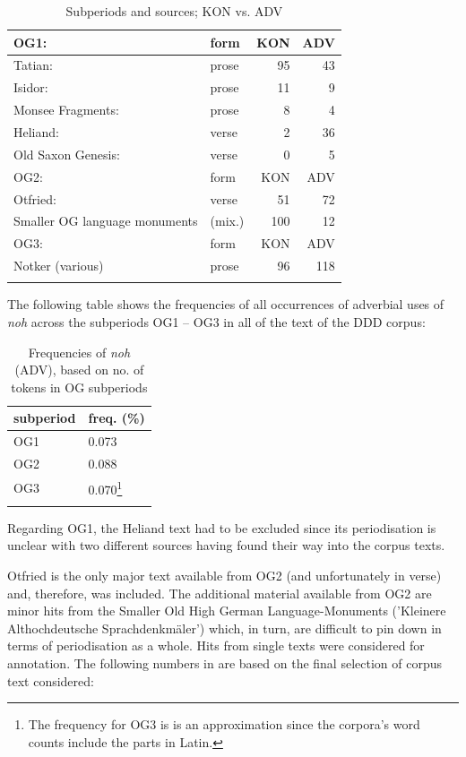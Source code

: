 \documentclass[output=paper,
modfonts
]{langscibook}
\begin{document}
\begin{table}[p]
\begin{tabular}{llrr}
\lsptoprule
{OG1:} & {form} & {KON} & {ADV}  \\
\midrule
Tatian: & prose & 95 & 43  \\
Isidor: & prose & 11 & 9 \\
Monsee Fragments: & prose & 8 & 4 \\
Heliand: & verse & 2 & 36 \\ %
Old Saxon Genesis: & verse & 0 & 5 \\
\midrule
{OG2:} & {form} & {KON} & {ADV}  \\
\midrule
Otfried: & verse & 51 & 72 \\
Smaller OG language monuments & (mix.) & 100 & 12 \\
\midrule
{OG3:} & {form} & {KON} & {ADV}  \\
\midrule
Notker (various) & prose & 96 & 118 \\
\lspbottomrule
\end{tabular}
\caption{Subperiods and sources; KON vs. ADV}
\label{tab:overview_subperiods_and_sources}
\end{table}

\noindent The following table shows the frequencies of all occurrences of adverbial uses of \textit{noh} across the subperiods OG1 -- OG3 in all of the text of the DDD corpus:

\begin{table}[p]
\begin{tabular}{ll}
\lsptoprule
subperiod	& freq. (\%)	\\
\midrule
OG1		& 0.073 \\
OG2		& 0.088 \\
OG3		& 0.070\footnote{The frequency for OG3 is is an approximation since the corpora's word counts include the parts in Latin.}\\
\lspbottomrule
\end{tabular}
\caption{Frequencies of \textit{noh} (ADV), based on no. of tokens in OG subperiods}
\label{tab:frequencies_of_noh}
\end{table}

\noindent Regarding OG1, the Heliand text had to be excluded since its periodisation is unclear with two different sources having found their way into the corpus texts.

Otfried is the only major text available from OG2 (and unfortunately in verse) and, therefore, was included. The additional material available from OG2 are minor hits from the Smaller Old High German Language-Monuments ('Kleinere Althochdeutsche Sprachdenkmäler') which, in turn, are difficult to pin down in terms of periodisation as a whole. Hits from single texts were considered for annotation. The following numbers in  are based on the final selection of corpus text considered:
\end{document}
